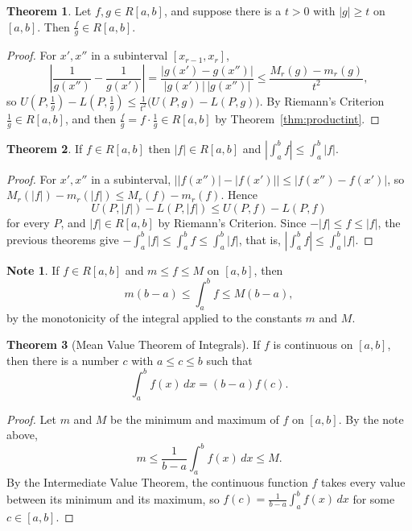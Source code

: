 \documentclass[11pt,a4paper]{article}
\numberwithin{equation}{section}
\theoremstyle{definition}
\newtheorem{thm}{Theorem}[subsection]
\newtheorem*{note}{Note}
\begin{document}
\begin{thm}
Let $f, g\in R[a,b]$, and suppose there is a $t>0$ with $|g| \geq t$ on $[a,b]$. Then $\frac{f}{g}\in R[a,b]$.
\end{thm}

\begin{proof}
For $x',x''$ in a subinterval $[x_{r-1},x_r]$,
$$\left|\frac{1}{g(x'')} - \frac{1}{g(x')}\right| = \frac{|g(x') - g(x'')|}{|g(x')|\,|g(x'')|}\leq\frac{M_r(g) - m_r(g)}{t^2},$$
so $U\left(P,\frac{1}{g}\right) - L\left(P,\frac{1}{g}\right)\leq\frac{1}{t^2}\bigl(U(P,g) - L(P,g)\bigr)$. By Riemann's Criterion $\frac{1}{g}\in R[a,b]$, and then $\frac{f}{g} = f\cdot\frac{1}{g}\in R[a,b]$ by Theorem~\ref{thm:productint}.
\end{proof}


\begin{thm}
If $f\in R[a,b]$ then $|f| \in R[a,b]$ and $\displaystyle\left|\int^b_a f\right| \leq \int^b_a|f|$.
\end{thm}

\begin{proof}
For $x',x''$ in a subinterval, $\bigl||f(x'')| - |f(x')|\bigr|\leq|f(x'') - f(x')|$, so $M_r(|f|) - m_r(|f|) \leq M_r(f) - m_r(f)$. Hence
$$U(P,|f|) - L(P,|f|)\leq U(P,f) - L(P,f)$$
for every $P$, and $|f|\in R[a,b]$ by Riemann's Criterion. Since $-|f|\leq f\leq|f|$, the previous theorems give $-\int_a^b|f|\leq\int_a^bf\leq\int_a^b|f|$, that is, $\left|\int^b_a f\right| \leq \int^b_a|f|$.
\end{proof}

\begin{note}
If $f\in R[a,b]$ and $m\leq f\leq M$ on $[a,b]$, then
$$m(b - a)\leq \int^b_af \leq M(b-a),$$
by the monotonicity of the integral applied to the constants $m$ and $M$.
\end{note}


\begin{thm}[Mean Value Theorem of Integrals]
If $f$ is continuous on $[a,b]$, then there is a number $c$ with $a \leq c \leq b$ such that
$$\int^b_a f(x)\,dx = (b-a) f(c) .$$
\end{thm}

\begin{proof}
Let $m$ and $M$ be the minimum and maximum of $f$ on $[a,b]$. By the note above,
$$m\leq \frac{1}{b - a} \int^b_af(x)\, dx \leq M .$$
By the Intermediate Value Theorem, the continuous function $f$ takes every value between its minimum and its maximum, so $f(c) = \frac{1}{b - a}\int^b_a f(x) \,dx$ for some $c\in[a,b]$.
\end{proof}
\end{document}
